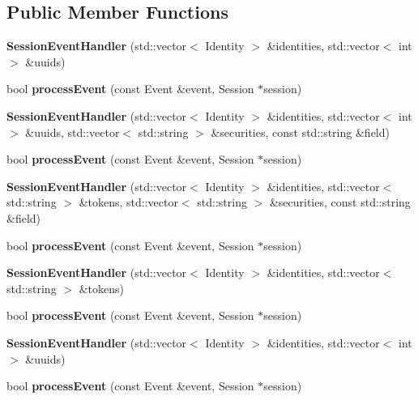 \subsection*{Public Member Functions}
\begin{DoxyCompactItemize}
\item 
{\bfseries Session\+Event\+Handler} (std\+::vector$<$ Identity $>$ \&identities, std\+::vector$<$ int $>$ \&uuids)\label{class_session_event_handler_ae31656c34c31f44dc456b23ee2ad7887}

\item 
bool {\bfseries process\+Event} (const Event \&event, Session $\ast$session)\label{class_session_event_handler_a084fa03586ec047c78600cea54a91355}

\item 
{\bfseries Session\+Event\+Handler} (std\+::vector$<$ Identity $>$ \&identities, std\+::vector$<$ int $>$ \&uuids, std\+::vector$<$ std\+::string $>$ \&securities, const std\+::string \&field)\label{class_session_event_handler_a12e1d80c3612273172d6d4c0e1776901}

\item 
bool {\bfseries process\+Event} (const Event \&event, Session $\ast$session)\label{class_session_event_handler_a084fa03586ec047c78600cea54a91355}

\item 
{\bfseries Session\+Event\+Handler} (std\+::vector$<$ Identity $>$ \&identities, std\+::vector$<$ std\+::string $>$ \&tokens, std\+::vector$<$ std\+::string $>$ \&securities, const std\+::string \&field)\label{class_session_event_handler_ab949db928e8f10779e46cb76bcb0ce7e}

\item 
bool {\bfseries process\+Event} (const Event \&event, Session $\ast$session)\label{class_session_event_handler_a084fa03586ec047c78600cea54a91355}

\item 
{\bfseries Session\+Event\+Handler} (std\+::vector$<$ Identity $>$ \&identities, std\+::vector$<$ std\+::string $>$ \&tokens)\label{class_session_event_handler_a5b53b782cee510f58ff8d5e79864cabe}

\item 
bool {\bfseries process\+Event} (const Event \&event, Session $\ast$session)\label{class_session_event_handler_a084fa03586ec047c78600cea54a91355}

\item 
{\bfseries Session\+Event\+Handler} (std\+::vector$<$ Identity $>$ \&identities, std\+::vector$<$ int $>$ \&uuids)\label{class_session_event_handler_ae31656c34c31f44dc456b23ee2ad7887}

\item 
bool {\bfseries process\+Event} (const Event \&event, Session $\ast$session)\label{class_session_event_handler_a084fa03586ec047c78600cea54a91355}

\end{DoxyCompactItemize}


